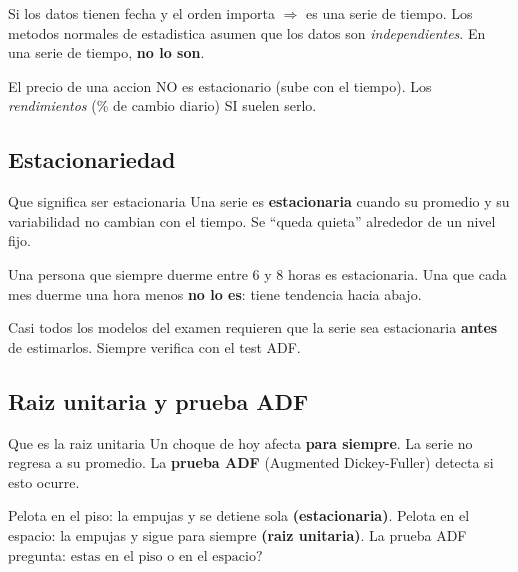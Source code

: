 \documentclass[12pt,a4paper]{article}
\begin{document}
\begin{examen}
Si los datos tienen fecha y el orden importa $\Rightarrow$ es una serie de tiempo.
Los metodos normales de estadistica asumen que los datos son \emph{independientes}.
En una serie de tiempo, \textbf{no lo son}.
\end{examen}

\begin{ojo}
El precio de una accion NO es estacionario (sube con el tiempo).
Los \emph{rendimientos} (\% de cambio diario) SI suelen serlo.
\end{ojo}

\subsection{Estacionariedad}

\begin{definicion}{Que significa ser estacionaria}
Una serie es \textbf{estacionaria} cuando su promedio y su variabilidad no cambian con el
tiempo. Se ``queda quieta'' alrededor de un nivel fijo.
\end{definicion}

\begin{analogia}
Una persona que siempre duerme entre 6 y 8 horas es estacionaria.
Una que cada mes duerme una hora menos \textbf{no lo es}: tiene tendencia hacia abajo.
\end{analogia}

\begin{examen}
Casi todos los modelos del examen requieren que la serie sea estacionaria
\textbf{antes} de estimarlos. Siempre verifica con el test ADF.
\end{examen}

\subsection{Raiz unitaria y prueba ADF}

\begin{definicion}{Que es la raiz unitaria}
Un choque de hoy afecta \textbf{para siempre}. La serie no regresa a su promedio.
La \textbf{prueba ADF} (Augmented Dickey-Fuller) detecta si esto ocurre.
\end{definicion}

\begin{analogia}
Pelota en el piso: la empujas y se detiene sola \textbf{(estacionaria)}.
Pelota en el espacio: la empujas y sigue para siempre \textbf{(raiz unitaria)}.
La prueba ADF pregunta: $\text{estas en el piso o en el espacio?}$
\end{analogia}
\end{document}

